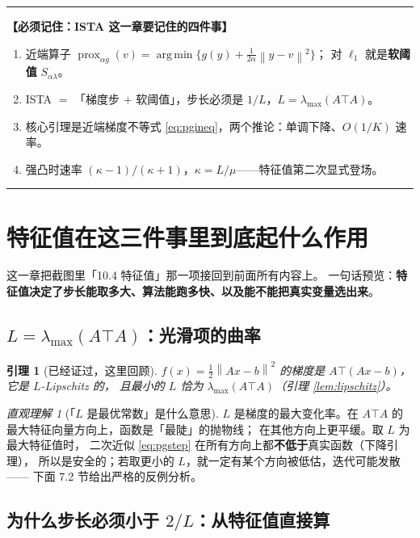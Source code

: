 \documentclass[11pt,a4paper,UTF8]{ctexart}
\theoremstyle{plain}
\newtheorem{lemma}[theorem]{引理}
\theoremstyle{definition}
\theoremstyle{remark}
\newtheorem{intuition}[theorem]{直观理解}
\newcommand{\norm}[1]{\left\lVert #1 \right\rVert}
\newcommand{\prox}{\operatorname{prox}}
\DeclareMathOperator*{\argmin}{arg\,min}
\newenvironment{keypoint}[1]
  {\par\medskip\noindent\begin{minipage}{\linewidth}%
   \hrule\smallskip\noindent\textbf{【必须记住：#1】}\par\nopagebreak\smallskip}
  {\smallskip\hrule\end{minipage}\medskip}
\begin{document}
\begin{keypoint}{ISTA 这一章要记住的四件事}
\begin{enumerate}
\item 近端算子 $\prox_{\alpha g}(v)=\argmin\{g(y)+\frac1{2\alpha}\norm{y-v}^2\}$；
      对 $\ell_1$ 就是\textbf{软阈值} $S_{\alpha\lambda}$。
\item ISTA $=$ 「梯度步 $+$ 软阈值」，步长必须是 $1/L$，$L=\lambda_{\max}(A\top A)$。
\item 核心引理是近端梯度不等式 \eqref{eq:pgineq}，两个推论：单调下降、$O(1/K)$ 速率。
\item 强凸时速率 $(\kappa-1)/(\kappa+1)$，$\kappa=L/\mu$——特征值第二次显式登场。
\end{enumerate}
\end{keypoint}

\section{特征值在这三件事里到底起什么作用}

这一章把截图里「10.4 特征值」那一项接回到前面所有内容上。
一句话预览：\textbf{特征值决定了步长能取多大、算法能跑多快、以及能不能把真实变量选出来}。

\subsection{$L=\lambda_{\max}(A\top A)$：光滑项的曲率}

\begin{lemma}[已经证过，这里回顾]
$f(x)=\tfrac12\norm{Ax-b}^2$ 的梯度是 $A\top(Ax-b)$，它是 $L$-Lipschitz 的，
且最小的 $L$ 恰为 $\lambda_{\max}(A\top A)$（引理 \ref{lem:lipschitz}）。
\end{lemma}

\begin{intuition}[「$L$ 是最优常数」是什么意思]
$L$ 是梯度的最大变化率。在 $A\top A$ 的最大特征向量方向上，函数是「最陡」的抛物线；
在其他方向上更平缓。取 $L$ 为最大特征值时，
二次近似 \eqref{eq:pgstep} 在所有方向上都\textbf{不低于}真实函数（下降引理），
所以是安全的；若取更小的 $L$，就一定有某个方向被低估，迭代可能发散——
下面 7.2 节给出严格的反例分析。
\end{intuition}

\subsection{为什么步长必须小于 $2/L$：从特征值直接算}
\end{document}
